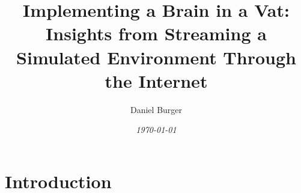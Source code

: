 \documentclass[10pt]{article}
\begin{document}
\setlength{\footskip}{65pt}


\title{\textbf{Implementing a Brain in a Vat:} \linebreak Insights from Streaming a Simulated Environment Through the Internet}
\author[1]{Daniel Burger}
\date{\textit{\today}}
\maketitle
\thispagestyle{empty}

\begin{sloppypar}
  \begin{abstract}
  \end{abstract}

  \pagebreak
  \tableofcontents
  \pagebreak
  \listoffigures
  \pagebreak
  \listoftables
  \pagebreak
  \lstlistoflistings
  \pagebreak


  \section{Introduction}
  \label{sec:introduction}



  \pagebreak
  
  

\end{sloppypar}
\end{document}
